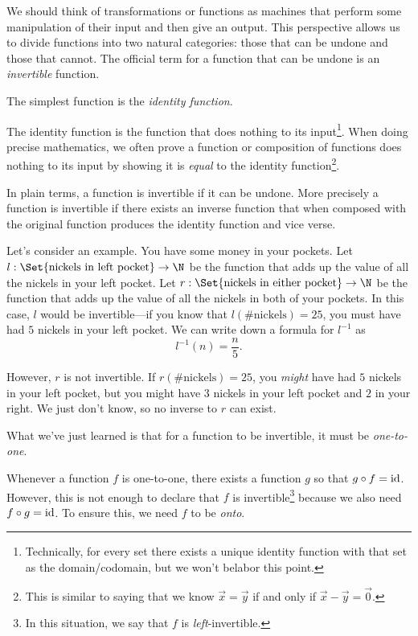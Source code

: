 
We should think of transformations or functions as machines
that perform some manipulation of their input and then give an output. This perspective 
allows us to divide functions into two natural categories: those that can be undone and
those that cannot. The official term for a function that can be undone is an
\emph{invertible} function.


The simplest function is the \emph{identity function}.


The identity function is the function that does nothing to its input\footnote{ Technically, for every
set there exists a unique identity function with that set as the domain/codomain, but we won't
belabor this point.}. When doing precise mathematics, we often prove a function or composition of functions
does nothing to its input by showing it is \emph{equal} to the identity function\footnote{ This is similar to saying that
we know $\vec x=\vec y$ if and only if $\vec x-\vec y=\vec 0$.}.

In plain terms, a function is invertible if it can be undone. More precisely a function
is invertible if there exists an inverse function that when composed with the original function
produces the identity function and vice verse.


Let's consider an example. You have some money in your 
pockets. Let $l:\Set{\text{nickels in left pocket}}\to \N$
be the function that adds up the value of all the nickels in your
left pocket. Let $r:\Set{\text{nickels in either pocket}}\to \N$
be the function that adds up the value of all the nickels in both of
your pockets. In this case, $l$ would be invertible---if you know that
$l(\text{\# nickels})=25$, you must have had $5$ nickels in your left pocket. We can write
down a formula for $l^{-1}$ as
\[
	l^{-1}(n)=\frac{n}{5}.
\]

However, $r$ is not invertible. If $r(\text{\# nickels})=25$, you \emph{might}
have had $5$ nickels in your left pocket, but you might have $3$ nickels in your left pocket
and $2$ in your right. We just don't know, so no inverse to $r$ can exist.

What we've just learned is that for a function to be invertible, it must be \emph{one-to-one}.


Whenever a function $f$ is one-to-one, there exists a function $g$ so that $g\circ f=\operatorname{\operatorname{id}}$.
However, this is not enough to declare that $f$ is invertible\footnote{ In this situation, we say that
$f$ is \emph{left}-invertible.} because we also need $f\circ g=\operatorname{\operatorname{id}}$. To ensure this, we need
$f$ to be \emph{onto}.

